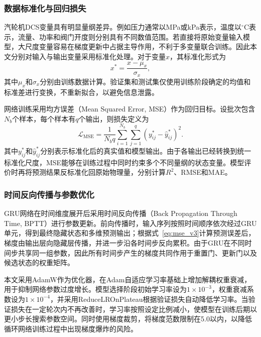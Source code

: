 \subsubsection{数据标准化与回归损失}

汽轮机DCS变量具有明显量纲差异。例如压力通常以MPa或kPa表示，温度以$^{\circ}$C表示，流量、功率和阀门开度则分别具有不同数值范围。若直接将原始变量输入模型，大尺度变量容易在梯度更新中占据主导作用，不利于多变量联合训练。因此本文分别对输入与输出变量采用标准化处理。对于变量$x$，其标准化形式为
\begin{equation}
    x^{*}=\frac{x-\mu_x}{\sigma_x},
    \label{eq:standardization_v3}
\end{equation}
其中$\mu_x$和$\sigma_x$分别由训练数据计算。验证集和测试集仅使用训练阶段确定的均值和标准差进行变换，不重新拟合，以避免信息泄露。

网络训练采用均方误差（Mean Squared Error, MSE）作为回归目标。设批次包含$N_b$个样本，每个样本有$q$个输出，则损失定义为
\begin{equation}
    \mathcal{L}_{\mathrm{MSE}}
    =\frac{1}{N_bq}
    \sum_{i=1}^{N_b}
    \sum_{j=1}^{q}
    \left(y^{*}_{ij}-\hat y^{*}_{ij}\right)^2.
    \label{eq:mse_v3}
\end{equation}
其中$y^{*}_{ij}$和$\hat y^{*}_{ij}$分别表示标准化后的真实值和模型输出。由于各输出已经转换到统一标准化尺度，MSE能够在训练过程中同时约束多个不同量纲的状态变量。模型评价时再将预测结果反标准化回原始物理量，分别计算$R^2$、RMSE和MAE。

\subsubsection{时间反向传播与参数优化}

GRU网络在时间维度展开后采用时间反向传播（Back Propagation Through Time, BPTT）进行参数更新。前向传播时，输入序列按照时间顺序依次经过GRU单元，得到最终隐藏状态和多维预测输出；根据式~\eqref{eq:mse_v3}计算预测误差后，梯度由输出层向隐藏层传播，并进一步沿各时间步反向累积。由于GRU在不同时间步共享同一组参数，因此所有时间步产生的梯度共同作用于重置门、更新门以及候选状态的权重矩阵。

本文采用AdamW作为优化器，在Adam自适应学习率基础上增加解耦权重衰减，用于抑制网络参数过度增长。模型选择阶段初始学习率设为$1\times10^{-3}$，权重衰减系数设为$1\times10^{-4}$，并采用ReduceLROnPlateau根据验证损失自动降低学习率。当验证损失在一定轮次内不再改善时，学习率按照设定比例减小，使模型在训练后期以更小步长搜索参数空间。同时使用梯度裁剪，将梯度范数限制在5.0以内，以降低循环网络训练过程中出现梯度爆炸的风险。

